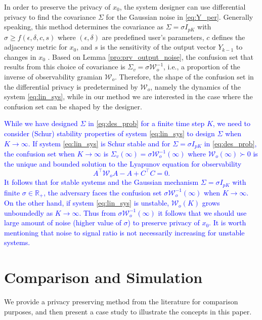 \documentclass{ifacconf}
\newcommand{\calW}{\ensuremath{\mathcal{W}}}
\newcommand{\R}{\ensuremath{\mathbb R}}
\newcommand{\+}{\mathsmaller{+}}
\newcommand{\blue}[1]{\textcolor{blue}{#1}}
\begin{document}
\begin{rem}
	In order to preserve the privacy of $x_0$, the system designer can use differential privacy to find the covariance $\Sigma$ for the Gaussian noise in \eqref{eq:Y_per}. Generally speaking, this method determines the covariance as $\Sigma = \sigma I_{pK}$ with $\sigma \geq f(\epsilon, \delta, c, s)$ where $(\epsilon, \delta)$ are predefined user's parameters, $c$ defines the adjacency metric for $x_0$, and $s$ is the sensitivity of the output vector $Y_{k-1}$ to changes in $x_0$ \cite[Theorem 3]{le2013differentially}. 
	Based on Lemma \ref{pro:prv_output_noise}, the confusion set that results from this choice of covariance is $\Sigma_v = \sigma \calW_o^{-1}$, i.e., a proportion of the inverse of observability gramian $\calW_o$.
	 Therefore, the shape of the confusion set in the differential privacy is predetermined by $\calW_o$, namely the dynamics of the system \eqref{eq:lin_sys}, while in our method we are interested in the case where the confusion set can be shaped by the designer.
\end{rem}
\begin{rem}\blue{
While we have designed $\Sigma$ in \eqref{eq:des_prob} for a finite time step $K$, 
we need to consider (Schur) stability properties of system \eqref{eq:lin_sys} to design $\Sigma$ when $K \to \infty$. If system \eqref{eq:lin_sys} is Schur stable and for $\Sigma = \sigma I_{pK}$ in \eqref{eq:des_prob}, the confusion set when $K \to \infty$ is $\Sigma_v(\infty) = \sigma \calW_o^{-1}(\infty)$ where $\calW_o(\infty) \succ 0$ is the unique and bounded solution to the Lyapunov equation for observability \cite[p.192]{hespanha2018linear}
$$A^{\top}\calW_o A - A + C^{\top}C = 0.$$
It follows that for stable systems and the Gaussian mechanism $\Sigma = \sigma I_{pK}$ with finite $\sigma \in \R_+$, the adversary faces the confusion set $\sigma \calW_o^{-1}(\infty)$ when $K \to \infty$. On the other hand, if system \eqref{eq:lin_sys} is unstable, $\calW_o(K)$ grows unboundedly as $K\to\infty$. Thus from $\sigma \calW_o^{-1}(\infty)$ it follows that we  should use large amount of noise (higher value of $\sigma$) to preserve privacy of $x_0$. It is worth mentioning that noise to signal ratio is not necessarily increasing for unstable systems.}
\end{rem}

\section{ Comparison and Simulation}\label{sec:Sim}
We provide a privacy preserving method from the literature for comparison purposes, and then present a case study to illustrate the concepts in this paper. 
\end{document}
